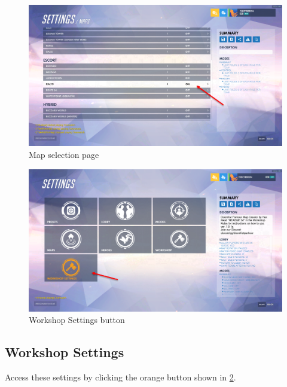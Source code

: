 \documentclass[12pt,a4paper]{article}
\begin{document}
        \begin{figure}[ht]
            \centering
            \includegraphics[width=\textwidth,height=\textheight,keepaspectratio]{Picture2.png}
            \caption{Map selection page}
            \label{fig:Picture2}
        \end{figure}
        
        \begin{figure}[ht]
            \centering
            \includegraphics[width=\textwidth,height=\textheight,keepaspectratio]{Picture4.png}
            \caption{Workshop Settings button}
            \label{fig:Picture4}
        \end{figure}
        \clearpage
    
    \subsection{Workshop Settings}
        Access these settings by clicking the orange  button shown in \cref{fig:Picture4}.
        
\end{document}
